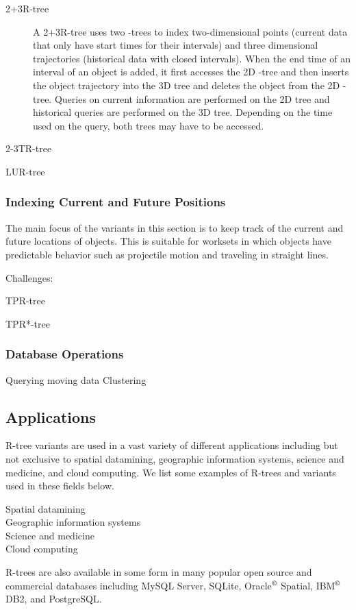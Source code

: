 \begin{description}
	\item[2+3R-tree] A 2+3R-tree\cite{nascimento1999evaluation} uses two 
	\rbase-trees to index two-dimensional points (current data that only have
	start times for their intervals) and three dimensional trajectories 
	(historical data with closed intervals). When the end time of an 
	interval of an object is added, it first accesses the 2D \rbase-tree
	and then inserts the object trajectory into the 3D tree and deletes the 
	object from the 2D \rbase-tree. Queries on current information are 
	performed on the 2D tree and historical queries are performed on the 3D
	tree. Depending on the time used on the query, both trees may have to be 
	accessed.
	\item[2-3TR-tree] \cite{abdelguerfi20022}
	\item[LUR-tree] \cite{kwon2002indexing}
\end{description}

\subsubsection{Indexing Current and Future Positions}
The main focus of the variants in this section is to keep track of the current
and future locations of objects. This is suitable for worksets in which 
objects have predictable behavior such as projectile motion and traveling in
straight lines.

Challenges:

\begin{description}
	\item[TPR-tree] \cite{vsaltenis2000indexing}
	\item[TPR*-tree] \cite{tao2003tpr}
\end{description}


\subsubsection{Database Operations}
Querying moving data
Clustering


\subsection{Applications}
R-tree variants are used in a vast variety of different applications including
but not exclusive to spatial datamining, geographic information systems, 
science and medicine, and cloud computing. We list some examples of R-trees
and variants used in these fields below.

\begin{description}
	\item[Spatial datamining]
	
	\item[Geographic information systems]
	\item[Science and medicine]
	\item[Cloud computing]
\end{description}

R-trees are also available in some form in many popular open source and 
commercial databases including MySQL Server, SQLite, Oracle$\textsuperscript{\textregistered}$ Spatial, IBM$\textsuperscript{\textregistered}$ DB2, and 
PostgreSQL. 

